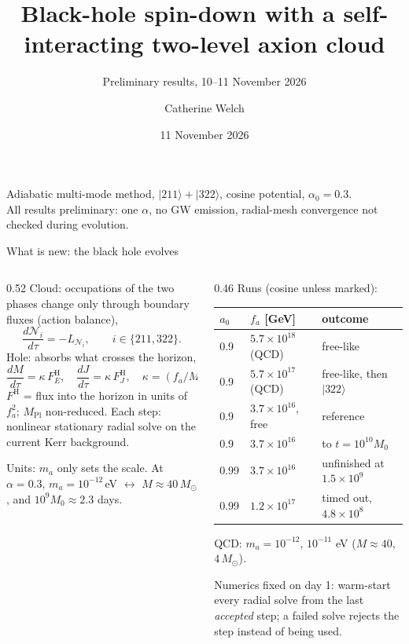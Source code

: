 \documentclass[aspectratio=169,10pt]{beamer}
\title{Black-hole spin-down with a self-interacting two-level axion cloud}
\subtitle{Preliminary results, 10--11 November 2026}
\author{Catherine Welch}
\date{11 November 2026}
\newcommand{\ket}[1]{|#1\rangle}
\newcommand{\Msun}{M_\odot}
\newcommand{\MPl}{M_{\mathrm{Pl}}}
\newcommand{\fa}{f_a}
\begin{document}
\begin{frame}
  \titlepage
  \centering\footnotesize
  Adiabatic multi-mode method, $\ket{211}+\ket{322}$, cosine potential, $\alpha_0 = 0.3$.\\
  All results preliminary: one $\alpha$, no GW emission, radial-mesh convergence not checked during evolution.
\end{frame}

\begin{frame}{What is new: the black hole evolves}
  \begin{columns}[T]
    \begin{column}{0.52\textwidth}
      \small
      Cloud: occupations of the two phases change only through boundary fluxes (action balance),
      \[ \frac{d\mathcal{N}_i}{d\tau} = -L_{\mathcal{N}_i}, \qquad i \in \{211, 322\}. \]
      Hole: absorbs what crosses the horizon,
      \[ \frac{dM}{d\tau} = \kappa\, F_E^{\mathrm{H}}, \quad \frac{dJ}{d\tau} = \kappa\, F_J^{\mathrm{H}}, \quad \kappa = (\fa/\MPl)^2, \]
      $F^{\mathrm{H}}$ = flux into the horizon in units of $\fa^2$; $\MPl$ non-reduced.
      Each step: nonlinear stationary radial solve on the current Kerr background.

      \medskip
      Units: $m_a$ only sets the scale. At $\alpha=0.3$, $m_a = 10^{-12}$\,eV $\leftrightarrow$ $M \approx 40\,\Msun$,
      and $10^{9} M_0 \approx 2.3$ days.
    \end{column}
    \begin{column}{0.46\textwidth}
      \footnotesize
      Runs (cosine unless marked):

      \smallskip
      \begin{tabular}{@{}lll@{}}
        \toprule
        $a_0$ & $\fa$ [GeV] & outcome \\
        \midrule
        0.9  & $5.7\times10^{18}$ (QCD) & free-like \\
        0.9  & $5.7\times10^{17}$ (QCD) & free-like, then $\ket{322}$ \\
        0.9  & $3.7\times10^{16}$, free & reference \\
        0.9  & $3.7\times10^{16}$ & to $t=10^{10}M_0$ \\
        0.99 & $3.7\times10^{16}$ & unfinished at $1.5\times10^9$ \\
        0.99 & $1.2\times10^{17}$ & timed out, $4.8\times10^8$ \\
        \bottomrule
      \end{tabular}

      \smallskip
      QCD: $m_a = 10^{-12}$, $10^{-11}$ eV ($M\approx 40$, $4\,\Msun$).

      \medskip
      Numerics fixed on day 1: warm-start every radial solve from the last \emph{accepted} step; a failed solve
      rejects the step instead of being used.
    \end{column}
  \end{columns}
\end{frame}
\end{document}
